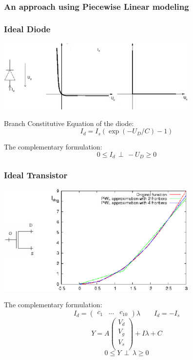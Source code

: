 \frame
{
  \frametitle{An approach using Piecewise Linear modeling}

}

 \frame
{
  \frametitle{Ideal Diode}
   \centerline{
  \includegraphics[width=100mm]{diode.eps}
  }
   \begin{block}{Branch Constitutive Equation of the diode:}
  \[ I_d =I_{s}(\exp{(-U_{D}/C)}-1)\]
  \end{block}
   \begin{block}{The complementary formulation:}
  \[0 \leq I_d \, \perp \, -U_{D} \geq 0\]
  \end{block}

}
\frame
{
  \frametitle{Ideal Transistor}
   \centerline{
  \includegraphics[width=100mm]{def2.eps}
  }
   \begin{block}{The complementary formulation:}
  \[ I_{d} = \left(\begin{array}{ccc}
  c_{1}&...&c_{10}\end{array}\right)\lambda \qquad  I_{d} = -I_{s}\]
  \[Y=A\left(\begin{array}{c}
  V_{d}\\
  V_{g}\\
  V_{s}\\\end{array}\right)+I\lambda + C\]
  \[0 \leq Y \, \perp \, \lambda \geq 0\]
  \end{block}

}
 
